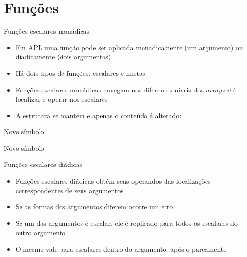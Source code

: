 \section{Funções}

\begin{frame}[fragile]{Funções escalares monádicas}

    \begin{itemize}
        \item Em APL uma função pode ser aplicada monadicamente (um argumento) ou diadicamente (dois argumentos)
        \pause

        \item Há dois tipos de funções: escalares e mistas
        \pause

        \item Funções escalares monádicas navegam nos diferentes níveis dos \textit{arrays} até localizar e operar nos escalares
        \pause

        \item A estrutura se mantem e apenas o conteúdo é alterado:
    \end{itemize}

\end{frame}

\begin{frame}[fragile]{Novo símbolo}


\end{frame}

\begin{frame}[fragile]{Novo símbolo}

\end{frame}

\begin{frame}[fragile]{Funções escalares diádicas}

    \begin{itemize}
        \item Funções escalares diádicas obtém seus operandos das localizações correspondentes de seus argumentos
        \pause

        \item Se as formas dos argumentos diferem ocorre um erro
        \pause

        \item Se um dos argumentos é escalar, ele é replicado para todos os escalares do outro argumento
        \pause

        \item O mesmo vale para escalares dentro do argumento, após o pareamento

    \end{itemize}

\end{frame}

